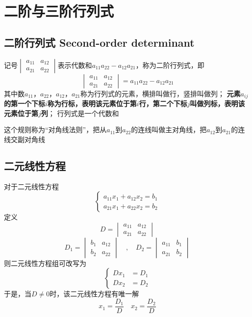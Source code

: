 \documentclass[UTF8]{ctexart}
\begin{document}
\section*{二阶与三阶行列式}
\subsection*{二阶行列式 Second-order determinant}
记号$\displaystyle \begin{vmatrix}a_{11}&a_{12}\\a_{21}&a_{22}\end{vmatrix}$表示代数和$a_{11}a_{22}-a_{12}a_{21}$，称为二阶行列式，即
\[\begin{vmatrix}a_{11}&a_{12}\\a_{21}&a_{22}\end{vmatrix}=a_{11}a_{22}-a_{12}a_{21}\]
其中数$a_{11}$，$a_{22}$，$a_{12}$，$a_{21}$称为行列式的元素，横排叫做行，竖排叫做列；
\textbf{元素$a_{ij}$的第一个下标$i$称为行标，表明该元素位于第$i$行，第二个下标$j$叫做列标，表明该元素位于第$j$列}；
行列式是一个代数和

这个规则称为“对角线法则”，把从$a_{11}$到$a_{22}$的连线叫做主对角线，把$a_{12}$到$a_{21}$的连线交副对角线

\subsection*{二元线性方程}
对于二元线性方程
\[\left\{
\begin{aligned}
a_{11}x_1+a_{12}x_2=b_1\\
a_{21}x_1+a_{22}x_2=b_2
\end{aligned}
\right.\]
定义
\[D=\begin{vmatrix}
a_{11}&a_{12}\\
a_{21}&a_{22}
\end{vmatrix}
\]
\[
D_1=\begin{vmatrix}
b_1&a_{12}\\
b_2&a_{22}
\end{vmatrix}
\quad,\quad
D_2=\begin{vmatrix}
a_{11}&b_1\\
a_{21}&b_2
\end{vmatrix}
\]
则二元线性方程组可改写为
\[\left\{
\begin{aligned}
  Dx_1&=D_1\\
  Dx_2&=D_2
\end{aligned}
\right.
\]
于是，当$D\ne0$时，该二元线性方程有唯一解
\[x_1=\frac{D_1}{D}\quad x_2=\frac{D_2}{D}\]
\end{document}
